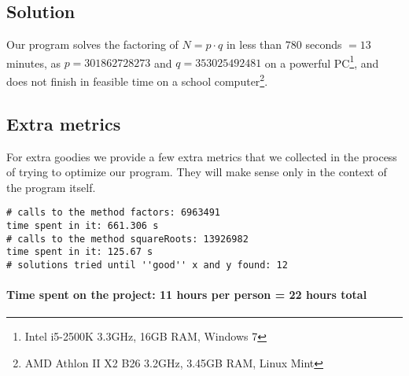 \documentclass[a4paper,titlepage]{article}
\begin{document}
\subsection*{Solution}
Our program solves the factoring of $N = p\cdot q$ in less than $780$ seconds $= 13$ minutes, as $p = 301862728273$ and $q = 353025492481$ on a powerful PC\footnote{Intel i5-2500K 3.3GHz, 16GB RAM, Windows 7}, and does not finish in feasible time on a school computer\footnote{AMD Athlon II X2 B26 3.2GHz, 3.45GB RAM, Linux Mint}.

\subsection*{Extra metrics}
For extra goodies we provide a few extra metrics that we collected in the process of trying to optimize our program. They will make sense only in the context of the program itself.

\begin{verbatim}
# calls to the method factors: 6963491
time spent in it: 661.306 s
# calls to the method squareRoots: 13926982
time spent in it: 125.67 s
# solutions tried until ''good'' x and y found: 12
\end{verbatim}

\vspace*{2cm}
\paragraph{Time spent on the project: 11 hours per person = 22 hours total}
\end{document}
